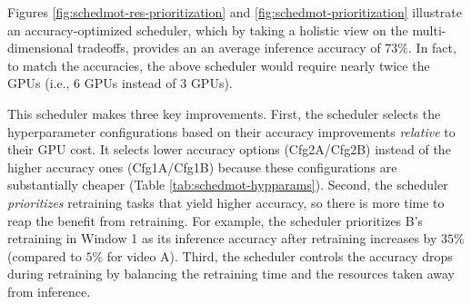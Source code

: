 Figures \ref{fig:schedmot-res-prioritization} and \ref{fig:schedmot-prioritization} illustrate an accuracy-optimized scheduler, which by taking a holistic view on the multi-dimensional tradeoffs, provides an an average inference accuracy of $73\%$. In fact, to match the accuracies, the above {\fair} scheduler would require nearly twice the GPUs (i.e., $6$ GPUs instead of $3$ GPUs). 

This scheduler makes three key improvements. First, the scheduler selects the hyperparameter configurations based on their accuracy improvements \emph{relative} to their GPU cost. It selects lower accuracy options ({Cfg2A/Cfg2B}) instead of the higher accuracy ones ({Cfg1A/Cfg1B}) because these configurations are substantially cheaper (Table \ref{tab:schedmot-hypparams}). 
Second, the scheduler \emph{prioritizes} retraining tasks that yield higher accuracy, so there is more time to reap the benefit from retraining. For example, the scheduler prioritizes B's retraining in Window 1 as its inference accuracy after retraining increases by $35\%$ (compared to $5\%$ for video A).
Third, the scheduler controls the accuracy drops during retraining by balancing the retraining time and the resources taken away from inference. %





